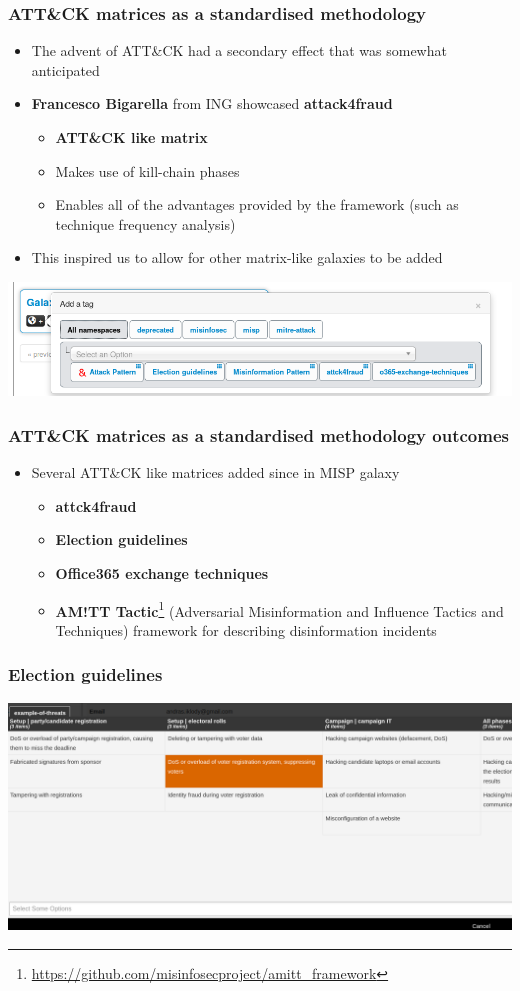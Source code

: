 \begin{frame}
  \frametitle{ATT\&CK matrices as a standardised methodology}
  \begin{itemize}
    \item The advent of ATT\&CK had a secondary effect that was somewhat anticipated
    \item {\bf Francesco Bigarella} from ING showcased {\bf attack4fraud}
    \begin{itemize}
      \item {\bf ATT\&CK like matrix}
      \item Makes use of kill-chain phases
      \item Enables all of the advantages provided by the framework (such as technique frequency analysis)
    \end{itemize}
    \item This inspired us to allow for other matrix-like galaxies to be added
  \end{itemize}
        \includegraphics[scale=0.3]{matrix-like.png}
\end{frame}


\begin{frame}
  \frametitle{ATT\&CK matrices as a standardised methodology outcomes}
  \begin{itemize}
    \item Several ATT\&CK like matrices added since in MISP galaxy
    \begin{itemize}
      \item {\bf attck4fraud}
      \item {\bf Election guidelines}
      \item {\bf Office365 exchange techniques}
      \item {\bf AM!TT Tactic}\footnote{\url{https://github.com/misinfosecproject/amitt_framework}} (Adversarial Misinformation and Influence Tactics and Techniques) framework for describing disinformation incidents
    \end{itemize}
  \end{itemize}
\end{frame}

\begin{frame}
  \frametitle{Election guidelines}
  \includegraphics[scale=0.3]{election.png}
\end{frame}

